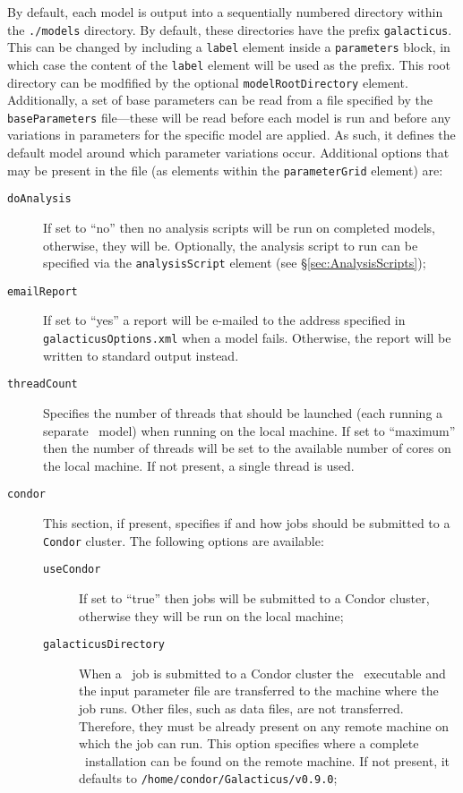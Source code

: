 By default, each model is output into a sequentially numbered directory within the {\tt ./models} directory. By default, these directories have the prefix {\tt galacticus}. This can be changed by including a {\tt label} element inside a {\tt parameters} block, in which case the content of the {\tt label} element will be used as the prefix. This root directory can be modfified by the optional {\tt modelRootDirectory} element. Additionally, a set of base parameters can be read from a file specified by the {\tt baseParameters} file---these will be read before each model is run and before any variations in parameters for the specific model are applied. As such, it defines the default model around which parameter variations occur. Additional options that may be present in the file (as elements within the {\tt parameterGrid} element) are:
\begin{description}
\item[{\tt doAnalysis}]If set to ``no'' then no analysis scripts will be run on completed models, otherwise, they will be. Optionally, the analysis script to run can be specified via the {\tt analysisScript} element (see \S\ref{sec:AnalysisScripts});
\item[{\tt emailReport}] If set to ``yes'' a report will be e-mailed to the address specified in {\tt galacticusOptions.xml} when a model fails. Otherwise, the report will be written to standard output instead.
\item[{\tt threadCount}] Specifies the number of threads that should be launched (each running a separate \glc\ model) when running on the local machine. If set to ``maximum'' then the number of threads will be set to the available number of cores on the local machine. If not present, a single thread is used.
\item[{\tt condor}] This section, if present, specifies if and how jobs should be submitted to a {\tt Condor} cluster. The following options are available:
\begin{description}
\item[{\tt useCondor}] If set to ``true'' then jobs will be submitted to a {\sc Condor} cluster, otherwise they will be run on the local machine;
\item[{\tt galacticusDirectory}] When a \glc\ job is submitted to a {\sc Condor} cluster the \glc\ executable and the input parameter file are transferred to the machine where the job runs. Other files, such as data files, are not transferred. Therefore, they must be already present on any remote machine on which the job can run. This option specifies where a complete \glc\ installation can be found on the remote machine. If not present, it defaults to {\tt /home/condor/Galacticus/v0.9.0};

\end{description}
\end{description}

